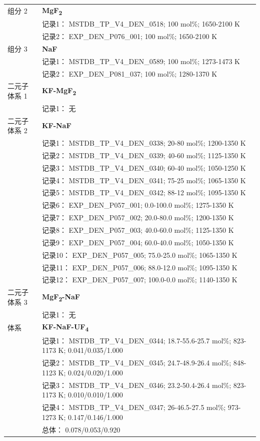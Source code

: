 \documentclass[12pt]{article}
\begin{document}
{\begin{longtable}[]{@{}
  >{\raggedright\arraybackslash}p{}
  >{\raggedright\arraybackslash}p{}@{}}
组分 2  & \textbf{MgF\textsubscript{2}} \\
 & 记录1： MSTDB\_TP\_V4\_DEN\_0518; 100 mol\%; 1650-2100 K \\
 & 记录2： EXP\_DEN\_P076\_001; 100 mol\%; 1650-2100 K  \\

组分 3  & \textbf{NaF} \\
 & 记录1： MSTDB\_TP\_V4\_DEN\_0589; 100 mol\%; 1273-1473 K \\
 & 记录2： EXP\_DEN\_P081\_037; 100 mol\%; 1280-1370 K  \\

二元子体系 1 & \textbf{KF-MgF\textsubscript{2}} \\
 & 记录1： 无 \\
二元子体系 2  & \textbf{KF-NaF} \\
 & 记录1： MSTDB\_TP\_V4\_DEN\_0338; 20-80 mol\%; 1200-1350 K \\
 & 记录2： MSTDB\_TP\_V4\_DEN\_0339; 40-60 mol\%; 1125-1350 K \\
 & 记录3： MSTDB\_TP\_V4\_DEN\_0340; 60-40 mol\%; 1050-1250 K \\
 & 记录4： MSTDB\_TP\_V4\_DEN\_0341; 75-25 mol\%; 1065-1350 K \\
 & 记录5： MSTDB\_TP\_V4\_DEN\_0342; 88-12 mol\%; 1095-1350 K \\
 & 记录6： EXP\_DEN\_P057\_001; 0.0-100.0 mol\%; 1275-1350 K \\
 & 记录7： EXP\_DEN\_P057\_002; 20.0-80.0 mol\%; 1200-1350 K \\
 & 记录8： EXP\_DEN\_P057\_003; 40.0-60.0 mol\%; 1125-1350 K \\
 & 记录9： EXP\_DEN\_P057\_004; 60.0-40.0 mol\%; 1050-1350 K \\
 & 记录10： EXP\_DEN\_P057\_005; 75.0-25.0 mol\%; 1065-1350 K \\
 & 记录11： EXP\_DEN\_P057\_006; 88.0-12.0 mol\%; 1095-1350 K \\
 & 记录12： EXP\_DEN\_P057\_007; 100.0-0.0 mol\%; 1140-1350 K  \\

二元子体系 3 & \textbf{MgF\textsubscript{2}-NaF} \\
 & 记录1： 无 \\
\midrule
体系 & \textbf{KF-NaF-UF\textsubscript{4}} \\
 & 记录1： MSTDB\_TP\_V4\_DEN\_0344; 18.7-55.6-25.7 mol\%; 823-1173 K; 0.041/0.035/1.000 \\
 & 记录2： MSTDB\_TP\_V4\_DEN\_0345; 24.7-48.9-26.4 mol\%; 848-1123 K; 0.024/0.020/1.000 \\
 & 记录3： MSTDB\_TP\_V4\_DEN\_0346; 23.2-50.4-26.4 mol\%; 823-1173 K; 0.010/0.010/1.000 \\
 & 记录4： MSTDB\_TP\_V4\_DEN\_0347; 26-46.5-27.5 mol\%; 973-1273 K; 0.147/0.146/1.000 \\
 & 总体： 0.078/0.053/0.920  \\


\end{longtable}}
\end{document}
